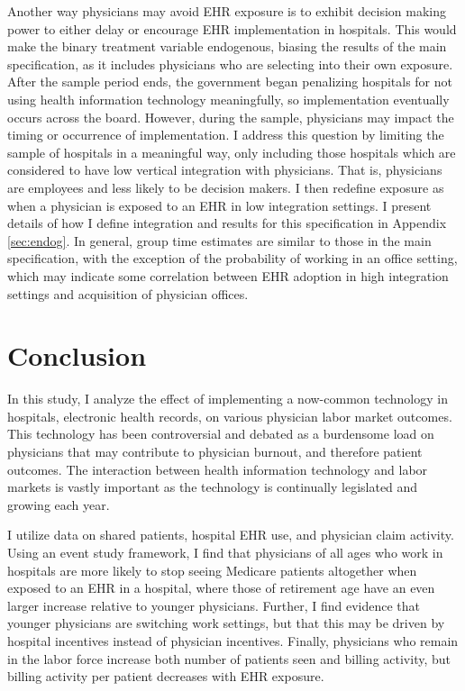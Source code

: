 \documentclass[12pt]{article}
\begin{document}
Another way physicians may avoid EHR exposure is to exhibit decision making power to either delay or encourage EHR implementation in hospitals. This would make the binary treatment variable endogenous, biasing the results of the main specification, as it includes physicians who are selecting into their own exposure. After the sample period ends, the government began penalizing hospitals for not using health information technology meaningfully, so implementation eventually occurs across the board. However, during the sample, physicians may impact the timing or occurrence of implementation. I address this question by limiting the sample of hospitals in a meaningful way, only including those hospitals which are considered to have low vertical integration with physicians. That is, physicians are employees and less likely to be decision makers. I then redefine exposure as when a physician is exposed to an EHR in low integration settings. I present details of how I define integration and results for this specification in Appendix \ref{sec:endog}. In general, group time estimates are similar to those in the main specification, with the exception of the probability of working in an office setting, which may indicate some correlation between EHR adoption in high integration settings and acquisition of physician offices. 


\section{Conclusion}

In this study, I analyze the effect of implementing a now-common technology in hospitals, electronic health records, on various physician labor market outcomes. This technology has been controversial and debated as a burdensome load on physicians that may contribute to physician burnout, and therefore patient outcomes. The interaction between health information technology and labor markets is vastly important as the technology is continually legislated and growing each year.

I utilize data on shared patients, hospital EHR use, and physician claim activity. Using an event study framework, I find that physicians of all ages who work in hospitals are more likely to stop seeing Medicare patients altogether when exposed to an EHR in a hospital, where those of retirement age have an even larger increase relative to younger physicians. Further, I find evidence that younger physicians are switching work settings, but that this may be driven by hospital incentives instead of physician incentives. Finally, physicians who remain in the labor force increase both number of patients seen and billing activity, but billing activity per patient decreases with EHR exposure. 
\end{document}

